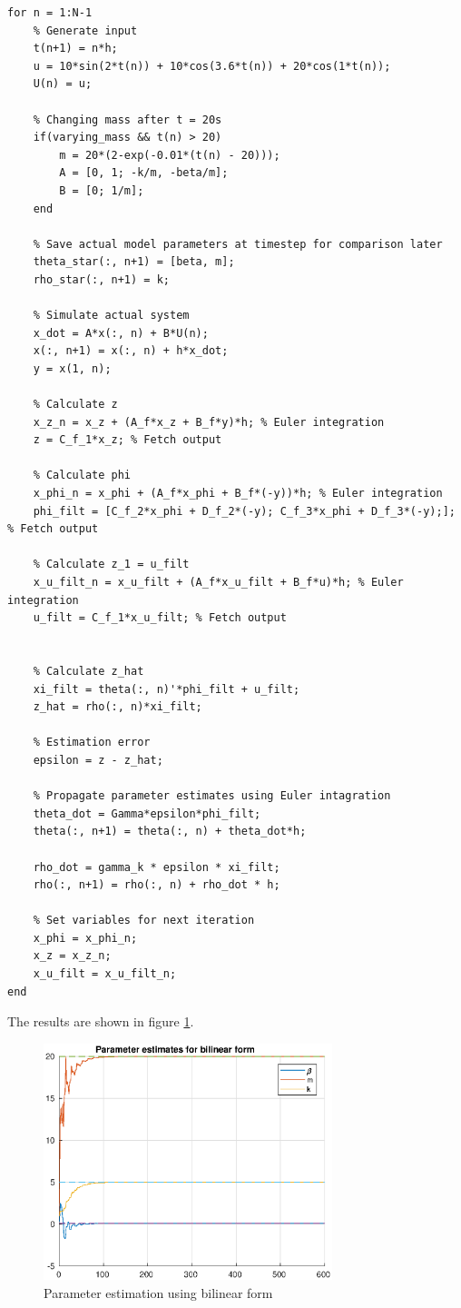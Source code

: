 \documentclass[]{article}
\begin{document}
\begin{lstlisting}[basicstyle=\tiny, caption={Main simulation loop}]
% Main simulation loop
for n = 1:N-1
    % Generate input
    t(n+1) = n*h;
    u = 10*sin(2*t(n)) + 10*cos(3.6*t(n)) + 20*cos(1*t(n));
    U(n) = u;

    % Changing mass after t = 20s
    if(varying_mass && t(n) > 20)
        m = 20*(2-exp(-0.01*(t(n) - 20)));
        A = [0, 1; -k/m, -beta/m];
        B = [0; 1/m];
    end

    % Save actual model parameters at timestep for comparison later
    theta_star(:, n+1) = [beta, m];
    rho_star(:, n+1) = k;

    % Simulate actual system
    x_dot = A*x(:, n) + B*U(n);
    x(:, n+1) = x(:, n) + h*x_dot;
    y = x(1, n);

    % Calculate z
    x_z_n = x_z + (A_f*x_z + B_f*y)*h; % Euler integration
    z = C_f_1*x_z; % Fetch output

    % Calculate phi
    x_phi_n = x_phi + (A_f*x_phi + B_f*(-y))*h; % Euler integration
    phi_filt = [C_f_2*x_phi + D_f_2*(-y); C_f_3*x_phi + D_f_3*(-y);]; % Fetch output

    % Calculate z_1 = u_filt
    x_u_filt_n = x_u_filt + (A_f*x_u_filt + B_f*u)*h; % Euler integration
    u_filt = C_f_1*x_u_filt; % Fetch output


    % Calculate z_hat
    xi_filt = theta(:, n)'*phi_filt + u_filt;
    z_hat = rho(:, n)*xi_filt;

    % Estimation error
    epsilon = z - z_hat;

    % Propagate parameter estimates using Euler intagration
    theta_dot = Gamma*epsilon*phi_filt;
    theta(:, n+1) = theta(:, n) + theta_dot*h;

    rho_dot = gamma_k * epsilon * xi_filt;
    rho(:, n+1) = rho(:, n) + rho_dot * h;

    % Set variables for next iteration
    x_phi = x_phi_n;
    x_z = x_z_n;
    x_u_filt = x_u_filt_n;
end
\end{lstlisting}
The results are shown in figure \ref{fig:const_mass}.
\begin{figure}[H]
\centering
\includegraphics[width=0.75\textwidth]{const_mass.eps}
\caption{Parameter estimation using bilinear form}
\label{fig:const_mass}
\end{figure}
\end{document}
